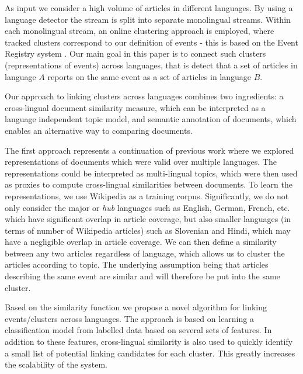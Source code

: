 \documentclass[twoside,11pt]{article}
\begin{document}
As input we consider a high volume of articles in different languages. By using a language detector the stream is split into separate monolingual streams. Within each monolingual stream, an online clustering approach is employed, where tracked clusters correspond to our definition of events - this is based on the Event Registry system . Our main goal in this paper is to connect such clusters (representations of events) across languages, that is detect that a set of articles in language $A$ reports on the same event as a set of articles in language $B$.

Our approach to linking clusters across languages combines two ingredients: a cross-lingual document similarity measure, which can be interpreted as a language independent topic model, and semantic annotation of documents, which enables an alternative way to comparing documents.

The first approach represents a continuation of previous work  where we explored representations of documents which were valid over multiple languages.  The representations could be interpreted as multi-lingual topics, which were then used as proxies to compute cross-lingual similarities between documents. To learn the representations, we use Wikipedia as a training corpus. Significantly, we do not only consider the major or \emph{hub} languages such as English, German, French, etc. which have significant overlap in article coverage, but also smaller languages (in terms of number of Wikipedia articles) such as Slovenian and Hindi, which may have a negligible overlap in article coverage. We can then define a similarity between any two articles regardless of language,  which allows us to cluster the articles according to topic. The underlying assumption being that articles describing the same event are similar  and will therefore be put into the same cluster.

Based on the similarity function we propose a novel algorithm for linking events/clusters across languages. The approach is based on learning a classification model from labelled data based on several sets of features. In addition to these features, cross-lingual similarity is also used to quickly identify a small list of potential linking candidates for each cluster.
This greatly increases the scalability of the system.
\end{document}
